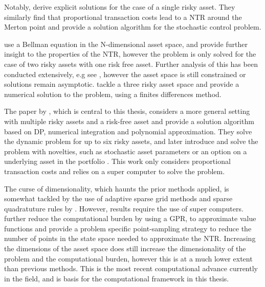 \documentclass[11pt]{article}
\begin{document}
Notably, \autocite{DavisNorman1990} derive explicit solutions for the case of a single risky asset.
They similarly find that proportional transaction costs lead to a \ac{NTR} around the Merton point and provide a solution algorithm for the stochastic control problem.

\autocite{Aikan1996} use a Bellman equation in the N-dimensional asset space, and provide further insight to the properties of the \ac{NTR}, however the problem is only solved for the case of two risky assets with one risk free asset.
Further analysis of this has been conducted extensively, e.g see \autocites{ShreveSoner1994}{Oksendal2002}{JanecekShreve2004}, however 
the asset space is still constrained or solutions remain asymptotic. 
\autocites{Muthuraman2006}{Muthuraman2008} tackle a three risky asset space and provide a numerical solution to the problem, using a finites differences method.

The paper by \autocite{CaiJuddXu2013}, which is central to this thesis, considers a more general setting with multiple risky assets and a risk-free asset
and provide a solution algorithm based on \ac{DP}, numerical integration and polynomial approximation.
They solve the dynamic problem for up to six risky assets,
and later introduce and solve the problem with novelties, such as stochastic asset parameters
or an option on a underlying asset in the portfolio \autocite{CaiJuddXu2020}. This work only considers proportional transaction costs and relies on a super computer to solve the problem.

The curse of dimensionality, which haunts the prior methods applied, is somewhat tackled by the use
of adaptive sparse grid methods and sparse quadratuture rules by \autocite{Schober2022}. However, results require the use of super computers. 
\autocite{Scheidegger2023} further reduce the computational burden by using a \ac{GPR},
to approximate value functions and provide a problem specific point-sampling strategy to reduce the number of points in the state space
needed to approximate the \ac{NTR}.
Increasing the dimensions of the asset space does still increase the dimensionality of the problem and the computational burden,
however this is at a much lower extent than previous methods. This is the most recent computational advance currently in the field, and is basis for the computational framework in this thesis.

\ifdefined\COMPILINGMAIN
\else
\printbibliography
\end{document}

